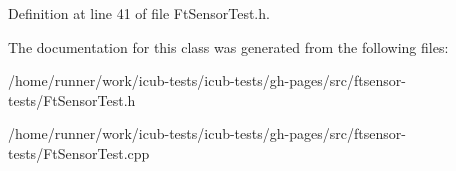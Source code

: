 Definition at line 41 of file Ft\+Sensor\+Test.\+h.



The documentation for this class was generated from the following files\+:\begin{DoxyCompactItemize}
\item 
/home/runner/work/icub-\/tests/icub-\/tests/gh-\/pages/src/ftsensor-\/tests/Ft\+Sensor\+Test.\+h\item 
/home/runner/work/icub-\/tests/icub-\/tests/gh-\/pages/src/ftsensor-\/tests/Ft\+Sensor\+Test.\+cpp\end{DoxyCompactItemize}
